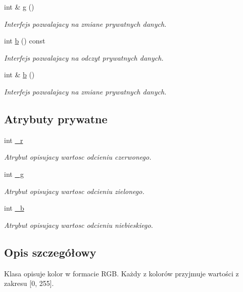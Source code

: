 \begin{DoxyCompactItemize}
int \& \hyperlink{class_kolor_ab5e20d58c58d42747c16155a83aa906f}{g} ()
\begin{DoxyCompactList}\small\item\em Interfejs pozwalajacy na zmiane prywatnych danych. \end{DoxyCompactList}\item 
int \hyperlink{class_kolor_aa240903064a3d8f49585c34d92b74e5d}{b} () const 
\begin{DoxyCompactList}\small\item\em Interfejs pozwalajacy na odczyt prywatnych danych. \end{DoxyCompactList}\item 
int \& \hyperlink{class_kolor_a87677bdafb912de9526302f4844f86a7}{b} ()
\begin{DoxyCompactList}\small\item\em Interfejs pozwalajacy na zmiane prywatnych danych. \end{DoxyCompactList}\end{DoxyCompactItemize}
\subsection*{Atrybuty prywatne}
\begin{DoxyCompactItemize}
\item 
int \hyperlink{class_kolor_ad887fb53be523b39fbead6a24671751e}{\-\_\-r}
\begin{DoxyCompactList}\small\item\em Atrybut opisujacy wartosc odcieniu czerwonego. \end{DoxyCompactList}\item 
int \hyperlink{class_kolor_a568f73268d43f0e76c8ae75f0ef20229}{\-\_\-g}
\begin{DoxyCompactList}\small\item\em Atrybut opisujacy wartosc odcieniu zielonego. \end{DoxyCompactList}\item 
int \hyperlink{class_kolor_a543b5984743ac9d471409c697382038b}{\-\_\-b}
\begin{DoxyCompactList}\small\item\em Atrybut opisujacy wartosc odcieniu niebieskiego. \end{DoxyCompactList}\end{DoxyCompactItemize}


\subsection{Opis szczegółowy}
Klasa opisuje kolor w formacie R\-G\-B. Każdy z kolorów przyjmuje wartości z zakresu \mbox{[}0, 255\mbox{]}. 

